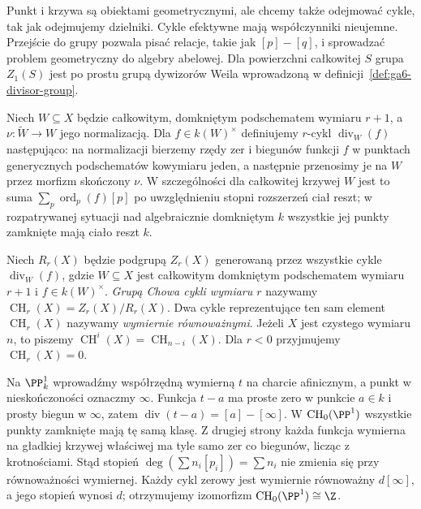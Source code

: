 \begin{uwaga}
Punkt i krzywa są obiektami geometrycznymi, ale chcemy także
odejmować cykle, tak jak odejmujemy dzielniki.
Cykle efektywne mają współczynniki nieujemne.
Przejście do grupy pozwala pisać relacje, takie jak
$[p]-[q]$, i sprowadzać problem geometryczny do algebry abelowej.
Dla powierzchni całkowitej $S$ grupa $Z_1(S)$
jest po prostu grupą dywizorów Weila wprowadzoną w
definicji~\ref{def:ga6-divisor-group}.
\end{uwaga}

\begin{definicja}
\label{def:ga7-rational-divisor}
Niech $W\subseteq X$ będzie całkowitym, domkniętym
podschematem wymiaru $r+1$, a $\nu:\widetilde W\to W$
jego normalizacją. Dla $f\in k(W)^\times$ definiujemy
$r$-cykl $\operatorname{div}_W(f)$ następująco:
na normalizacji bierzemy rzędy zer i biegunów funkcji $f$
w punktach generycznych podschematów kowymiaru jeden,
a następnie przenosimy je na $W$ przez morfizm skończony $\nu$.
W szczególności dla całkowitej krzywej $W$ jest to
suma $\sum_p\operatorname{ord}_p(f)[p]$ po uwzględnieniu
stopni rozszerzeń ciał reszt; w rozpatrywanej sytuacji
nad algebraicznie domkniętym $k$ wszystkie jej punkty zamknięte
mają ciało reszt $k$.
\end{definicja}

\begin{definicja}
\label{def:ga7-chow}
Niech $R_r(X)$ będzie podgrupą $Z_r(X)$ generowaną przez
wszystkie cykle $\operatorname{div}_W(f)$, gdzie
$W\subseteq X$ jest całkowitym domkniętym podschematem
wymiaru $r+1$ i $f\in k(W)^\times$.
\emph{Grupą Chowa cykli wymiaru $r$} nazywamy
$\operatorname{CH}_r(X)=Z_r(X)/R_r(X)$.
Dwa cykle reprezentujące ten sam element $\operatorname{CH}_r(X)$
nazywamy \emph{wymiernie równoważnymi}.
Jeżeli $X$ jest czystego wymiaru $n$, to piszemy
$\operatorname{CH}^i(X)=\operatorname{CH}_{n-i}(X)$.
Dla $r<0$ przyjmujemy $\operatorname{CH}_r(X)=0$.
\end{definicja}

\begin{przyklad}
\label{prz:ga7-p1-points}
Na $\PP^1_k$ wprowadźmy współrzędną wymierną $t$ na
charcie afinicznym, a punkt w nieskończoności oznaczmy
$\infty$. Funkcja $t-a$ ma proste zero w punkcie $a\in k$
i prosty biegun w $\infty$, zatem
$\operatorname{div}(t-a)=[a]-[\infty]$.
W $\operatorname{CH}_0(\PP^1)$ wszystkie punkty zamknięte
mają tę samą klasę. Z drugiej strony każda funkcja wymierna
na gładkiej krzywej właściwej ma tyle samo zer co biegunów,
licząc z krotnościami. Stąd stopień
$\deg(\sum n_i[p_i])=\sum n_i$ nie zmienia się przy
równoważności wymiernej. Każdy cykl zerowy jest wymiernie
równoważny $d[\infty]$, a jego stopień wynosi $d$;
otrzymujemy izomorfizm $\operatorname{CH}_0(\PP^1)\cong\Z$.
\end{przyklad}


